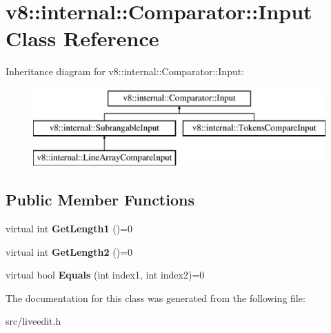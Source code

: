 \hypertarget{classv8_1_1internal_1_1_comparator_1_1_input}{}\section{v8\+:\+:internal\+:\+:Comparator\+:\+:Input Class Reference}
\label{classv8_1_1internal_1_1_comparator_1_1_input}
Inheritance diagram for v8\+:\+:internal\+:\+:Comparator\+:\+:Input\+:\begin{figure}[H]
\begin{center}
\leavevmode
\includegraphics[height=3.000000cm]{classv8_1_1internal_1_1_comparator_1_1_input}
\end{center}
\end{figure}
\subsection*{Public Member Functions}
\begin{DoxyCompactItemize}
\item 
\hypertarget{classv8_1_1internal_1_1_comparator_1_1_input_aafec821f76bae31fbc0d90787b87ee65}{}virtual int {\bfseries Get\+Length1} ()=0\label{classv8_1_1internal_1_1_comparator_1_1_input_aafec821f76bae31fbc0d90787b87ee65}

\item 
\hypertarget{classv8_1_1internal_1_1_comparator_1_1_input_a05e45844d9326262cb31459978e1198e}{}virtual int {\bfseries Get\+Length2} ()=0\label{classv8_1_1internal_1_1_comparator_1_1_input_a05e45844d9326262cb31459978e1198e}

\item 
\hypertarget{classv8_1_1internal_1_1_comparator_1_1_input_a4f03cc734488c64a27fe01bd57107cac}{}virtual bool {\bfseries Equals} (int index1, int index2)=0\label{classv8_1_1internal_1_1_comparator_1_1_input_a4f03cc734488c64a27fe01bd57107cac}

\end{DoxyCompactItemize}


The documentation for this class was generated from the following file\+:\begin{DoxyCompactItemize}
\item 
src/liveedit.\+h\end{DoxyCompactItemize}
